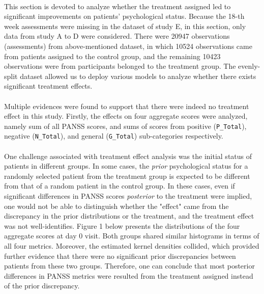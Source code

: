 \documentclass[11pt]{article}
\begin{document}
	\paragraph{}This section is devoted to analyze whether the treatment assigned led to significant improvements on patients' psychological status. Because the 18-th week assessments were missing in the dataset of study E, in this section, only data from study A to D were considered. There were 20947 observations (assessments) from above-mentioned dataset, in which 10524 observations came from patients assigned to the control group, and the remaining 10423 observations were from participants belonged to the treatment group. The evenly-split dataset allowed us to deploy various models to analyze whether there exists significant treatment effects.
	
	\paragraph{}Multiple evidences were found to support that there were indeed no treatment effect in this study. Firstly, the effects on four aggregate scores were analyzed, namely sum of all PANSS scores, and sums of scores from positive (\texttt{P\_Total}), negative (\texttt{N\_Total}), and general (\texttt{G\_Total}) sub-categories respectively.
	
	\paragraph{}One challenge associated with treatment effect analysis was the initial status of patients in different groups. In some cases, the \emph{prior} psychological status for a randomly selected patient from the treatment group is expected to be different from that of a random patient in the control group. In these cases, even if significant differences in PANSS scores \emph{posterior} to the treatment were implied, one would not be able to distinguish whether the "effect" came from the discrepancy in the prior distributions or the treatment, and the treatment effect was not well-identifies.
	Figure 1 below presents the distributions of the four aggregate scores at day 0 visit. Both groups shared similar histograms in terms of all four metrics. Moreover, the estimated kernel densities collided, which provided further evidence that there were no significant prior discrepancies between patients from these two groups. Therefore, one can conclude that most posterior differences in PANSS metrics were resulted from the treatment assigned instead of the prior discrepancy.
\end{document}
